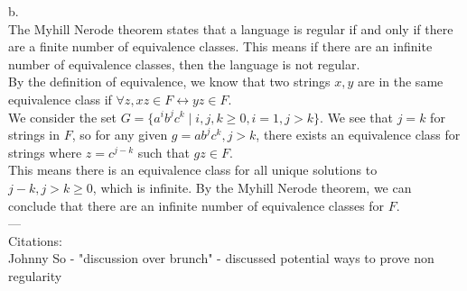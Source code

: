 \documentclass[11pt]{article}
\begin{document}
\noindent
b.\\
The Myhill Nerode theorem states that a language is regular if and only if there are a finite number of equivalence classes. This means if there are an infinite number of equivalence classes, then the language is not regular.\\
By the definition of equivalence, we know that two strings $x,y$ are in the same equivalence class if $\forall z, xz\in F \leftrightarrow yz\in F$.\\
We consider the set $G=\{a^i b^j c^k \mid i,j,k\geq0, i=1, j>k\}$. We see that $j=k$ for strings in $F$, so for any given $g=a b^j c^k, j>k$, there exists an equivalence class for strings where $z=c^{j-k}$ such that $gz\in F$.\\
This means there is an equivalence class for all unique solutions to $j-k, j>k\geq0$, which is infinite. By the Myhill Nerode theorem, we can conclude that there are an infinite number of equivalence classes for $F$.\\

---\\
Citations:\\
Johnny So - "discussion over brunch" - discussed potential ways to prove non regularity
\end{document}

